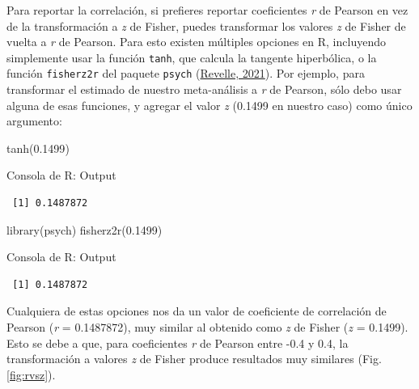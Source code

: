 \documentclass[
  bookmarksnumbered]{article}
\newenvironment{Shaded}{\begin{snugshade}}{\end{snugshade}}
\newcommand{\FloatTok}[1]{\textcolor[rgb]{0.69,0.50,0.00}{#1}}
\newcommand{\FunctionTok}[1]{\textcolor[rgb]{0.39,0.29,0.61}{#1}}
\newcommand{\NormalTok}[1]{\textcolor[rgb]{0.12,0.11,0.11}{#1}}
\begin{document}
Para reportar la correlación, si prefieres reportar coeficientes \emph{r} de Pearson en vez de la transformación a \emph{z} de Fisher, puedes transformar los valores \emph{z} de Fisher de vuelta a \emph{r} de Pearson. Para esto existen múltiples opciones en R, incluyendo simplemente usar la función \texttt{tanh}, que calcula la tangente hiperbólica, o la función \texttt{fisherz2r} del paquete \texttt{psych} (\protect\hyperlink{ref-revellePsych2021}{Revelle, 2021}). Por ejemplo, para transformar el estimado de nuestro meta-análisis a \emph{r} de Pearson, sólo debo usar alguna de esas funciones, y agregar el valor \emph{z} (0.1499 en nuestro caso) como único argumento:

\begin{Shaded}
\begin{Highlighting}[]
\FunctionTok{tanh}\NormalTok{(}\FloatTok{0.1499}\NormalTok{)}
\end{Highlighting}
\end{Shaded}

\begin{ROut}{Consola de R: Output~\thetcbcounter}
                \begin{footnotesize}
                \begin{verbatim} [1] 0.1487872
 \end{verbatim}
                \end{footnotesize}
                \end{ROut}

\begin{Shaded}
\begin{Highlighting}[]
\FunctionTok{library}\NormalTok{(psych)}
\FunctionTok{fisherz2r}\NormalTok{(}\FloatTok{0.1499}\NormalTok{)}
\end{Highlighting}
\end{Shaded}

\begin{ROut}{Consola de R: Output~\thetcbcounter}
                \begin{footnotesize}
                \begin{verbatim} [1] 0.1487872
 \end{verbatim}
                \end{footnotesize}
                \end{ROut}

Cualquiera de estas opciones nos da un valor de coeficiente de correlación de Pearson (\emph{r} = 0.1487872), muy similar al obtenido como \emph{z} de Fisher (\emph{z} = 0.1499). Esto se debe a que, para coeficientes \emph{r} de Pearson entre -0.4 y 0.4, la transformación a valores \emph{z} de Fisher produce resultados muy similares (Fig. \ref{fig:rvsz}).
\end{document}
